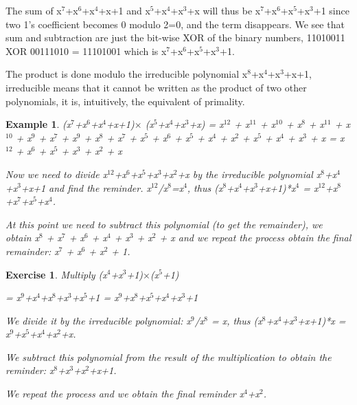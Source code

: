 \documentclass[a4paper, 12pt]{report}
\newtheorem{example}{\textbf{Example}}
\newtheorem{exercise}{\textbf{Exercise}}
\begin{document}
The sum of x$^7$+x$^6$+x$^4$+x+1 and x$^5$+x$^4$+x$^3$+x will thus be x$^7$+x$^6$+x$^5$+x$^3$+1 since two 1's coefficient becomes 0 modulo 2=0, and the term disappears. We see that sum and subtraction are just the bit-wise XOR of the binary numbers, 11010011 XOR 00111010 = 11101001 which is x$^7$+x$^6$+x$^5$+x$^3$+1.

The product is done modulo the irreducible polynomial x$^8$+x$^4$+x$^3$+x+1, irreducible means that it cannot be written as the product of two other polynomials, it is, intuitively, the equivalent of primality.
\begin{example}
	(x$^7$+x$^6$+x$^4$+x+1)$\times$ (x$^5$+x$^4$+x$^3$+x) = x$^{12}$ + x$^{11}$ + x$^{10}$ + x$^8$ + x$^{11}$ + x$^{10}$ + x$^9$ + x$^7$ + x$^9$ + x$^8$ + x$^7$ + x$^5$ + x$^6$ + x$^5$ + x$^4$ + x$^2$ + x$^5$ + x$^4$ + x$^3$ + x = x$^{12}$ + x$^6$ + x$^5$ + x$^3$ + x$^2$ + x
	
	Now we need to divide x$^{12}$+x$^6$+x$^5$+x$^3$+x$^2$+x by the irreducible polynomial x$^8$+x$^4$+x$^3$+x+1 and find the reminder. x$^{12}$/x$^8$=x$^4$, thus (x$^8$+x$^4$+x$^3$+x+1)*x$^4$ = x$^{12}$+x$^8$+x$^7$+x$^5$+x$^4$.
	
	At this point we need to subtract this polynomial (to get the remainder), we obtain x$^8$ + x$^7$ + x$^6$ + x$^4$ + x$^3$ + x$^2$ + x and we repeat the process obtain the final remainder: x$^7$ + x$^6$ + x$^2$ + 1.  
\end{example}

\begin{exercise}
	Multiply (x$^4$+x$^3$+1)$\times$(x$^5$+1)
	
	= x$^9$+x$^4$+x$^8$+x$^3$+x$^5$+1 = x$^9$+x$^8$+x$^5$+x$^4$+x$^3$+1
	
	We divide it by the irreducible polynomial: x$^9$/x$^8$ = x, thus (x$^8$+x$^4$+x$^3$+x+1)*x = x$^{9}$+x$^5$+x$^4$+x$^2$+x.
	
	We subtract this polynomial from the result of the multiplication to obtain the reminder: x$^8$+x$^3$+x$^2$+x+1.
	
	We repeat the process and we obtain the final reminder x$^4$+x$^2$.
\end{exercise}
\end{document}
